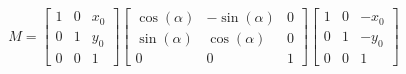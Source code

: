 \documentclass{article}
\begin{document}
\thispagestyle{empty}


$$
M=\begin{bmatrix}1&0&x_0\\0&1&y_0\\0&0&1\end{bmatrix}
\begin{bmatrix}\cos(\alpha)&-\sin(\alpha)&0\\\sin(\alpha)&\cos(\alpha)&0\\0&0&1\end{bmatrix}
\begin{bmatrix}1&0&-x_0\\0&1&-y_0\\0&0&1\end{bmatrix}
$$
\end{document}
